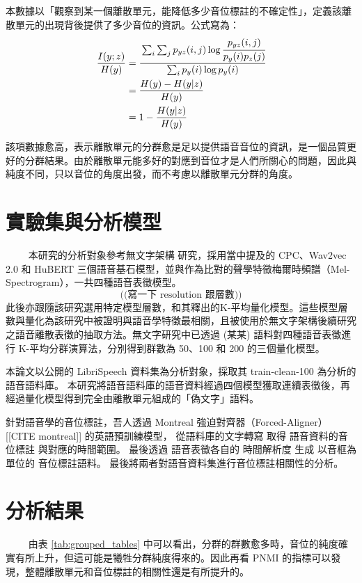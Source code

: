 本數據以「觀察到某一個離散單元，能降低多少音位標註的不確定性」，定義該離散單元的出現背後提供了多少音位的資訊。公式寫為：
\begin{align}
\frac{I(y;z)}{H(y)}&=\cfrac{\sum_i \sum_j p_{yz}(i, j) \log \cfrac{p_{yz}(i, j)}{p_y(i)p_z(j)}}{\sum_i p_y(i) \log p_y(i)} \\
&=\frac{H(y)-H(y|z)}{H(y)} \\
&=1-\frac{H(y|z)}{H(y)}
\end{align}

該項數據愈高，表示離散單元的分群愈是足以提供語音音位的資訊，是一個品質更好的分群結果。由於離散單元能多好的對應到音位才是人們所關心的問題，因此與純度不同，只以音位的角度出發，而不考慮以離散單元分群的角度。



\section{實驗集與分析模型}
　　
本研究的分析對象參考無文字架構 \cite{noauthor_textless_2021, lakhotia_generative_2021, lakhotia_generative_2021-1}  研究，採用當中提及的 CPC、Wav2vec 2.0 和 HuBERT 三個語音基石模型，並與作為比對的聲學特徵梅爾時頻譜（Mel-Spectrogram），一共四種語音表徵模型。
$$
\text{((寫一下 resolution 跟層數))}
$$
此後亦跟隨該研究選用特定模型層數，和其釋出的K-平均量化模型。這些模型層數與量化為該研究中被證明與語音學特徵最相關，且被使用於無文字架構後續研究之語音離散表徵的抽取方法。無文字研究中已透過 (某某) 語料對四種語音表徵進行 K-平均分群演算法，分別得到群數為 50、100 和 200 的三個量化模型。

本論文以公開的 LibriSpeech 資料集為分析對象，採取其 train-clean-100 為分析的語音語料庫。
本研究將語音語料庫的語音資料經過四個模型獲取連續表徵後，再經過量化模型得到完全由離散單元組成的「偽文字」語料。

針對語音學的音位標註，吾人透過 Montreal 強迫對齊器（Forced-Aligner） [[CITE montreal]] 的英語預訓練模型， 從語料庫的文字轉寫 取得 語音資料的音位標註 與對應的時間範圍。 最後透過 語音表徵各自的 時間解析度 生成 以音框為單位的 音位標註語料。
最後將兩者對語音資料集進行音位標註相關性的分析。

\section{分析結果}

　　
由表 \ref{tab:grouped_tables} 中可以看出，分群的群數愈多時，音位的純度確實有所上升，但這可能是犧牲分群純度得來的。因此再看 PNMI 的指標可以發現，整體離散單元和音位標註的相關性還是有所提升的。

